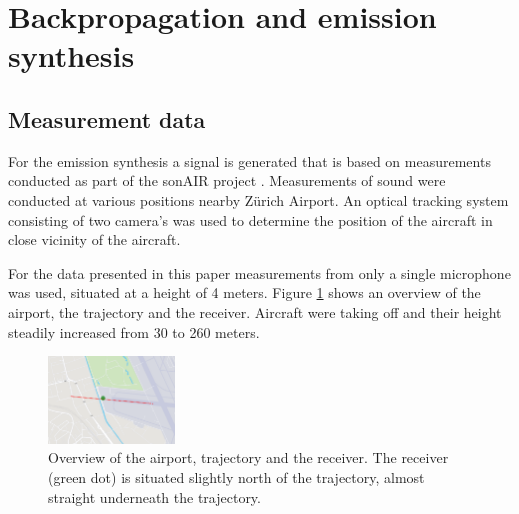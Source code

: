 \newpage\section{Backpropagation and emission synthesis}

\subsection{Measurement data}
For the emission synthesis a signal is generated that is based on measurements
conducted as part of the sonAIR project \cite{Zellmann2013}. Measurements of
sound were conducted at various positions nearby Z\"{u}rich Airport. An
optical tracking system consisting of two camera's was used to determine the
position of the aircraft in close vicinity of the aircraft.

For the data presented in this paper measurements from only a single microphone
was used, situated at a height of 4 meters. Figure \ref{fig:figure_trajectory}
shows an overview of the airport, the trajectory and the receiver. Aircraft were
taking off and their height steadily increased from 30 to 260 meters.


\begin{figure}[H]
  \centering
  \includegraphics[width=0.3\textwidth]{../figures/manual/auralisation-paper/figure_trajectory}
  \caption{Overview of the airport, trajectory and the receiver. The receiver
(green dot) is situated slightly north of the trajectory, almost straight underneath the
trajectory.}
  \label{fig:figure_trajectory}
\end{figure}


